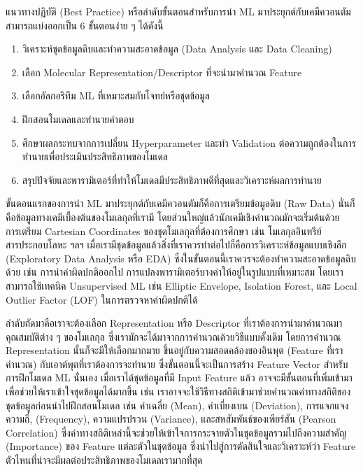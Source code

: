 แนวทางปฏิบัติ (Best Practice) หรือลำดับขั้นตอนสำหรับการนำ ML มาประยุกต์กับเคมีควอนตัมสามารถแบ่งออกเป็น 6 ขั้นตอนง่าย ๆ ได้ดังนี้
%
\begin{enumerate}[topsep=0pt,noitemsep]\setlength\itemsep{0.5em}
    \item วิเคราะห์ชุดข้อมูลดิบและทำความสะอาดข้อมูล (Data Analysis และ Data Cleaning)

    \item เลือก Molecular Representation/Descriptor ที่จะนำมาคำนวณ Feature

    \item เลือกอัลกอริทึม ML ที่เหมาะสมกับโจทย์หรือชุดข้อมูล

    \item ฝึกสอนโมเดลและทำนายคำตอบ

    \item ศึกษาผลกระทบจากการเปลี่ยน Hyperparameter และทำ Validation ต่อความถูกต้องในการทำนายเพื่อประเมินประสิทธิภาพของโมเดล

    \item สรุปปัจจัยและพารามิเตอร์ที่ทำให้โมเดลมีประสิทธิภาพดีที่สุดและวิเคราะห์ผลการทำนาย
\end{enumerate}

ขั้นตอนแรกของการนำ ML มาประยุกต์กับเคมีควอนตัมก็คือการเตรียมข้อมูลดิบ (Raw Data) นั่นก็คือข้อมูลทางเคมีเบื้องต้นของโมเลกุลที่เรามี โดยส่วนใหญ่แล้วนักเคมีเชิงคำนวณมักจะเริ่มต้นด้วยการเตรียม Cartesian Coordinates ของชุดโมเลกุลที่ต้องการศึกษา เช่น โมเลกุลอินทรีย์ สารประกอบโลหะ ฯลฯ เมื่อเรามีชุดข้อมูลแล้วสิ่งที่เราควรทำต่อไปก็คือการวิเคราะห์ข้อมูลแบบเชิงลึก (Exploratory Data Analysis หรือ EDA) ซึ่งในขั้นตอนนี้เราควรจะต้องทำความสะอาดข้อมูลดิบด้วย เช่น การนำค่าผิดปกติออกไป การแปลงพารามิเตอร์บางค่าให้อยู่ในรูปแบบที่เหมาะสม โดยเราสามารถใช้เทคนิค Unsupervised ML เช่น Elliptic Envelope, Isolation Forest, และ Local Outlier Factor (LOF) ในการตรวจหาค่าผิดปกติได้

ลำดับถัดมาคือเราจะต้องเลือก Representation หรือ Descriptor ที่เราต้องการนำมาคำนวณมาคุณสมบัติต่าง ๆ ของโมเลกุล ซึ่งเรามักจะได้มาจากการคำนวณด้วยวิธีแบบดั้งเดิม โดยการคำนวณ Representation นั้นก็จะมีให้เลือกมากมาย ขึ้นอยู่กับความสอดคล้องของอินพุต (Feature ที่เราคำนวณ) กับเอาต์พุตที่เราต้องการจะทำนาย ซึ่งขั้นตอนนี้จะเป็นการสร้าง Feature Vector สำหรับการฝึกโมเดล ML นั่นเอง เมื่อเราได้ชุดข้อมูลที่มี Input Feature แล้ว อาจจะมีขั้นตอนที่เพิ่มเข้ามาเพื่อช่วยให้เราเข้าใจชุดข้อมูลได้มากขึ้น เช่น เราอาจจะใช้วิธีทางสถิติเข้ามาช่วยคำนวณค่าทางสถิติของชุดข้อมูลก่อนนำไปฝึกสอนโมเดล เช่น ค่าเฉลี่ย (Mean), ค่าเบี่ยงเบน (Deviation), การแจกแจงความถี่, (Frequency), ความแปรปรวน (Variance), และสหสัมพันธ์ของเพียร์สัน (Pearson Correlation) ซึ่งค่าทางสถิติเหล่านี้จะช่วยให้เข้าใจการกระจายตัวในชุดข้อมูลรวมไปถึงความสำคัญ (Importance) ของ Feature แต่ละตัวในชุดข้อมูล ซึ่งนำไปสู่การตัดสินใจและวิเคราะห์ว่า Feature ตัวไหนที่น่าจะมีผลต่อประสิทธิภาพของโมเดลเรามากที่สุด

